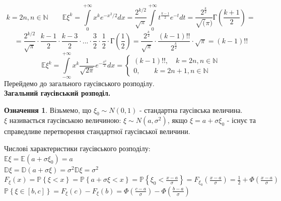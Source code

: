 \documentclass[fontsize=14pt,a4paper]{scrartcl}
\theoremstyle{definition}
\newtheorem*{defo}{Означення}
\theoremstyle{remark}
\theoremstyle{definition}
\theoremstyle{definition}
\begin{document}
$$
k = 2n, n\in \mathbb{N} \qquad \mathbb{E} \xi^k =   \int\limits_{0}^{ +\infty}{ x^k e^ { -x^2/2 }dx} = \frac{2^{k/2}}{\sqrt{\pi}}  \int\limits_{0}^{ +\infty}{ t^ { \frac{k-1}{2}  } e^{-t} dt} = \frac{2^ \frac{k}{2} }{ \sqrt(\pi) } \text{Г} ( \frac{k+1}{2} ) =
$$
$$
= \frac{2^ {k/2}}{\sqrt{\pi}} \cdot \frac{k-1}{2} \cdot \frac{k-3}{2}  \cdot ... \cdot \frac{3}{2} \cdot \frac{1}{2} \cdot \text{Г} ( \frac{1}{2} )= \frac{2^{ \frac{k}{2} }}{\sqrt{\pi}}\cdot \frac{(k-1)!!}{ 2^{ \frac{k}{2} }} \cdot \sqrt{\pi} = (k-1)!!
$$
$$
\mathbb{E} \xi ^k =   \int\limits_{-\infty}^{ +\infty}{ x^k \frac{1}{ \sqrt{2 \pi}} e ^ { - \frac{x^2}{2} } dx} = \left\lbrace \begin{gathered}
 (k-1)!! ,\quad k = 2n, n \in \mathbb{N}\\
 0 ,\qquad k = 2n+ 1, n \in \mathbb{N}
\end{gathered} \right.
$$
Перейдемо до загального гаусівського розподілу.\\
\textbf{Загальний гаусівський розподіл.}
\begin{defo}
Візьмемо, що $\xi_0 \sim N(0, 1)$ - стандартна гаусівська величина. \\
$\xi$ називається гаусівською величиною: $ \xi \sim N(a, \sigma^2)$, якщо $ \xi = a + \sigma \xi_0$ - існує та справедливе перетворення стандартної гаусівської величини.
\end{defo}
Числові характеристики гаусівського розподілу:\\
$\mathbb{E} \xi = \mathbb{E}(a + \sigma \xi_0) = a$\\
$\mathbb{D} \xi = \mathbb{D} (a + \sigma \xi) = \sigma^2 \mathbb{D} \xi = \sigma^2$\\
$ F_ \xi (x) = \mathbb{P} \left\lbrace \xi <x \right\rbrace = \mathbb{P} \left\lbrace a + \sigma\xi  < x \right\rbrace = \mathbb{P} \left\lbrace \xi_0 < \frac{x-a}{ \sigma}  \right\rbrace = F_ { \xi_0}( \frac{x-a}{\sigma} 	) = \frac{1}{2} + \Phi ( \frac{x-a}{\sigma} ) $ \\
$\mathbb{P} \left\lbrace  \xi \in [b,c] \right\rbrace = F_ \xi (c) - F_ \xi (b) = \Phi( \frac{c-a}{\sigma} ) - \Phi( \frac{b-a}{\sigma} )$\\
\end{document}
